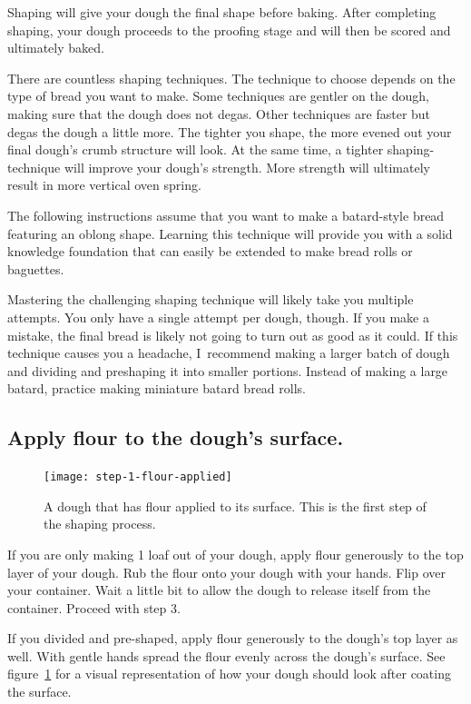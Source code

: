 Shaping will give your dough the final shape before baking. After
completing shaping, your dough proceeds to the proofing stage and
will then be scored and ultimately baked.

There are countless shaping techniques. The technique to choose
depends on the type of bread you want to make. Some techniques
are gentler on the dough, making sure that the dough does not
degas. Other techniques are faster but degas the dough a little
more. The tighter you shape, the more evened out your final dough's
crumb structure will look. At the same time, a tighter shaping-technique
will improve your dough's strength. More strength will ultimately result
in more vertical oven spring.

The following instructions assume that you want to make a batard-style
bread featuring an oblong shape. Learning this technique
will provide you with a solid knowledge foundation that
can easily be extended to make bread rolls or baguettes.

Mastering the challenging shaping technique will likely take you
multiple attempts. You only have a single attempt per dough, though. If you
make a mistake, the final bread is likely not going to turn out as good
as it could. If this technique causes you a headache, I~recommend making
a larger batch of dough and dividing and preshaping it into
smaller portions. Instead of making a large batard, practice making miniature
batard bread rolls.

\subsection[Flouring the surface]{Apply flour to the dough's surface.}

\begin{figure}[!htb]
  \texttt{[image: step-1-flour-applied]}
  \caption[Step 1 of shaping process]{A dough that has flour applied to its
      surface. This is the first step of the shaping process.}%
  \label{fig:shaping-flour-surface}
\end{figure}

If you are only making 1 loaf out of your dough, apply flour
generously to the top layer of your dough. Rub the flour onto your
dough with your hands. Flip over your container. Wait a little bit
to allow the dough to release itself from the container. Proceed
with step 3.

If you divided and pre-shaped, apply flour generously to the dough's
top layer as well. With gentle hands spread the flour evenly across
the dough's surface. See figure~\ref{fig:shaping-flour-surface} for a
visual representation of how your dough should look after coating
the surface.

